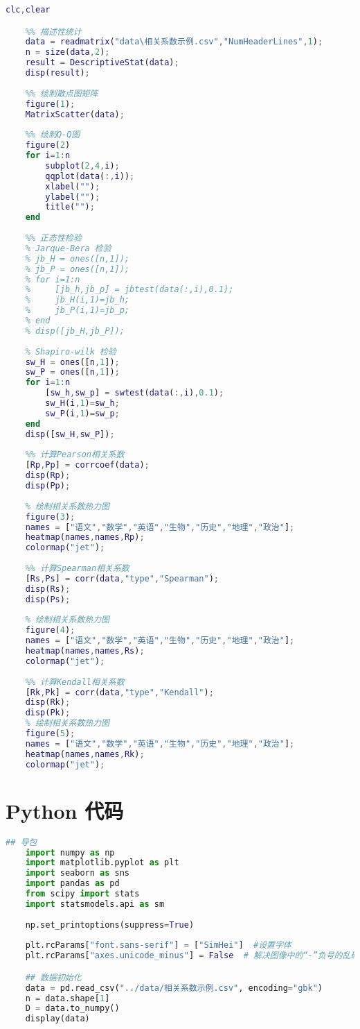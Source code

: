 \documentclass[withoutpreface]{cumcmthesis}
\begin{document}
    \begin{lstlisting}[language=matlab ,caption={相关系数分析示例} ]
    clc,clear

    %% 描述性统计
    data = readmatrix("data\相关系数示例.csv","NumHeaderLines",1);
    n = size(data,2);
    result = DescriptiveStat(data);
    disp(result);
    
    %% 绘制散点图矩阵
    figure(1);
    MatrixScatter(data);
    
    %% 绘制Q-Q图
    figure(2)
    for i=1:n
        subplot(2,4,i);
        qqplot(data(:,i));
        xlabel("");
        ylabel("");
        title("");
    end
    
    %% 正态性检验
    % Jarque-Bera 检验
    % jb_H = ones([n,1]);
    % jb_P = ones([n,1]);
    % for i=1:n
    %     [jb_h,jb_p] = jbtest(data(:,i),0.1);
    %     jb_H(i,1)=jb_h;
    %     jb_P(i,1)=jb_p;
    % end
    % disp([jb_H,jb_P]);
    
    % Shapiro-wilk 检验
    sw_H = ones([n,1]);
    sw_P = ones([n,1]);
    for i=1:n
        [sw_h,sw_p] = swtest(data(:,i),0.1);
        sw_H(i,1)=sw_h;
        sw_P(i,1)=sw_p;
    end
    disp([sw_H,sw_P]);
    
    %% 计算Pearson相关系数
    [Rp,Pp] = corrcoef(data);
    disp(Rp);
    disp(Pp);
    
    % 绘制相关系数热力图
    figure(3);
    names = ["语文","数学","英语","生物","历史","地理","政治"];
    heatmap(names,names,Rp);
    colormap("jet");
    
    %% 计算Spearman相关系数
    [Rs,Ps] = corr(data,"type","Spearman");
    disp(Rs);
    disp(Ps);
    
    % 绘制相关系数热力图
    figure(4);
    names = ["语文","数学","英语","生物","历史","地理","政治"];
    heatmap(names,names,Rs);
    colormap("jet");
    
    %% 计算Kendall相关系数
    [Rk,Pk] = corr(data,"type","Kendall");
    disp(Rk);
    disp(Pk);
    % 绘制相关系数热力图
    figure(5);
    names = ["语文","数学","英语","生物","历史","地理","政治"];
    heatmap(names,names,Rk);
    colormap("jet");        
    \end{lstlisting}

\section{Python 代码}

    \begin{lstlisting}[language=python ,caption=初始化 ]
    ## 导包
    import numpy as np
    import matplotlib.pyplot as plt
    import seaborn as sns
    import pandas as pd
    from scipy import stats
    import statsmodels.api as sm
    
    np.set_printoptions(suppress=True)
    
    plt.rcParams["font.sans-serif"] = ["SimHei"]  #设置字体
    plt.rcParams["axes.unicode_minus"] = False  # 解决图像中的“-”负号的乱码问题

    ## 数据初始化
    data = pd.read_csv("../data/相关系数示例.csv", encoding="gbk")
    n = data.shape[1]
    D = data.to_numpy()
    display(data)
    \end{lstlisting}
\end{document}
